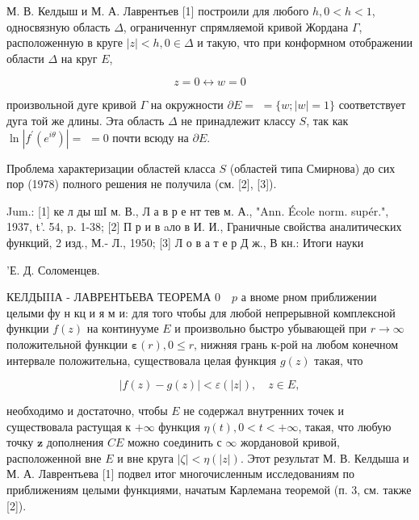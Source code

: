 \documentclass[10pt]{article}
\begin{document}
М. В. Келдыш и М. А. Лаврентьев [1] построили для любого $h, 0<h<1$, односвязную область $\Delta$, ограниченнуг спрямляемой кривой Жордана $\Gamma$, расположенную в круге $|z|<h, 0 \in \Delta$ и такую, что при конформном отображении области $\Delta$ на круг $E$,



\[

z=0 \leftrightarrow w=0

\]



произвольной дуге кривой $\Gamma$ на окружности $\partial E=$ $=\{w ;|w|=1\}$ соответствует дуга той же длины. Эта область $\Delta$ не принадлежит классу $S$, так как $\ln \left|f^{\prime}\left(e^{i \theta}\right)\right|=$ $=0$ почти всюду на $\partial E$.



Проблема характеризации областей класса $S$ (областей типа Смирнова) до сих пор (1978) полного решения не получила (см. [2], [3]).



Jum.: [1] ке л ды шI м. В., Л а в р е нт тев м. А., "Ann. École norm. supér.", 1937, t'. 54, p. 1-38; [2] П р и в aло в И. И., Граничные свойства аналитических функций, 2 изд., М.- Л., 1950; [3] Л о в а т е р Д ж., В кн.: Итоги науки



'Е. Д. Соломенцев.



КЕЛДЫIIА - ЛАВРЕНТЬЕВА ТЕОРЕМА $0 \quad p$ а вноме рном приближении целыми фу н кц и я м и: для того чтобы для любой непрерывной комплексной функции $f(z)$ на континууме $E$ и произвольно быстро убывающей при $r \rightarrow \infty$ положительной функции $\boldsymbol{\varepsilon}(r), 0 \leqslant r$, нижняя грань к-рой на любом конечном интервале положительна, существовала целая функция $g(z)$ такая, что



\[

|f(z)-g(z)|<\varepsilon(|z|), \quad z \in E,

\]



необходимо и достаточно, чтобы $E$ не содержал внутренних точек и существовала растущая к $+\infty$ функция $\eta(t), 0<t<+\infty$, такая, что любую точку $\boldsymbol{z}$ дополнения $C E$ можно соединить с $\infty$ жордановой кривой, расположенной вне $E$ и вне круга $|\zeta|<\eta(|z|)$. Этот результат М. В. Келдыша и М. А. Лаврентьева [1] подвел итог многочисленным исследованиям по приближениям целыми функциями, начатым Карлемана теоремой (п. 3, см. также [2]).
\end{document}
